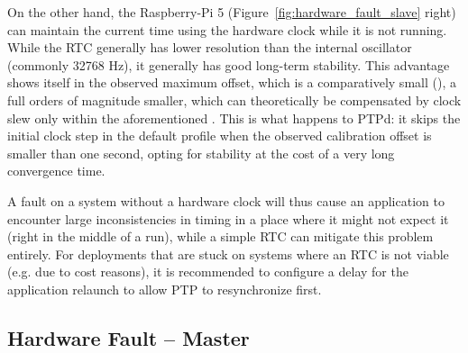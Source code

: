 On the other hand, the Raspberry-Pi 5 (Figure~\ref{fig:hardware_fault_slave} right) can maintain the current time using the hardware clock while it is not running. While the RTC generally has lower resolution than the internal oscillator (commonly 32768 Hz), it generally has good long-term stability. This advantage shows itself in the observed maximum offset, which is a comparatively small \fTimeMS{\cmpMax} (\fVendor{\cmpMaxArg}), a full  orders of magnitude smaller, which can theoretically be compensated by clock slew only within the aforementioned . This is what happens to PTPd: it skips the initial clock step in the default profile when the observed calibration offset is smaller than one second, opting for stability at the cost of a very long convergence time.

A fault on a system without a hardware clock will thus cause an application to encounter large inconsistencies in timing in a place where it might not expect it (right in the middle of a run), while a simple RTC can mitigate this problem entirely. For deployments that are stuck on systems where an RTC is not viable (e.g. due to cost reasons), it is recommended to configure a delay for the application relaunch to allow PTP to resynchronize first.

\subsection{Hardware Fault -- Master}



